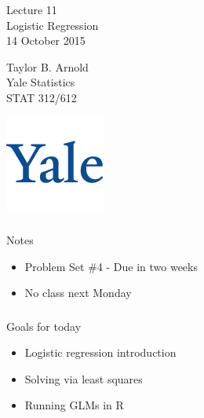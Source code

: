   



\begin{frame}[fragile] \frametitle{}

\vfill

{\fontsize{0.7cm}{0cm}\selectfont Lecture 11 \\\vspace{0.2cm}
Logistic Regression}\\\vspace{0.5cm}
14 October 2015

\vspace{2cm}

\begin{minipage}{0.6\textwidth}
Taylor B. Arnold \\
Yale Statistics \\
STAT 312/612
\end{minipage}
\hfill
\begin{minipage}{0.3\textwidth}\raggedleft
\includegraphics[scale=0.3]{../yale-logo.png}
\end{minipage}%

\end{frame}

\begin{frame}[fragile] \frametitle{}

{\color{yaleblue}\fontsize{16pt}{20pt}\selectfont Notes}

\begin{itemize}
\item Problem Set \#4 - Due in two weeks
\item No class next Monday
\end{itemize}

\end{frame}

\begin{frame}[fragile] \frametitle{}

{\color{yaleblue}\fontsize{16pt}{20pt}\selectfont Goals for today}

\begin{itemize}
\item Logistic regression introduction
\item Solving via least squares
\item Running GLMs in R
\end{itemize}

\end{frame}

